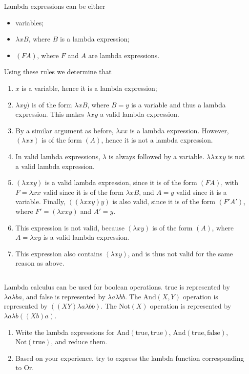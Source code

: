 \begin{solution}
	Lambda expressions can be either
	\begin{itemize}
		\item variables;
		\item \(\lambda x B\), where \(B\) is a lambda expression;
		\item \((F A)\), where \(F\) and \(A\) are lambda expressions.
	\end{itemize}
	Using these rules we determine that
	\begin{enumerate}
		\item \(x\) is a variable, hence it is a lambda expression;
		\item \(\lambda x y)\) is of the form \(\lambda x B\),
		where \(B = y\) is a variable and thus a lambda expression.
		This makes \(\lambda x y\) a valid lambda expression.
		\item By a similar argument as before, \(\lambda x x\)
		is a lambda expression.
		However, \((\lambda x x)\) is of the form \((A)\),
		hence it is not a lambda expression.
		\item In valid lambda expressions,
		\(\lambda\) is always followed by a variable.
		\(\lambda \lambda xxy\) is not a valid lambda expression.
		\item \((\lambda x x y)\) is a valid lambda expression,
		since it is of the form \((F A)\), with
		\(F = \lambda xx\) valid since it is
		of the form \(\lambda x B\),
		and \(A = y\) valid since it is a variable.
		Finally, \(((\lambda xxy)y)\) is also valid,
		since it is of the form \((F' A')\),
		where \(F' = (\lambda x x y)\) and \(A' = y\).
		\item This expression is not valid,
		because \((\lambda x y)\) is of the form \((A)\),
		where \(A = \lambda x y\) is a valid lambda expression.
		\item This expression also contains \((\lambda x y)\),
		and is thus not valid for the same reason as above.
	\end{enumerate}
\end{solution}

\subsection{} %
Lambda calculus can be used for boolean operations.
\(\mathrm{true}\) is represented by \(\lambda a \lambda b a\),
and false is represented by \(\lambda a \lambda b b\).
The \(\mathrm{And}(X, Y)\) operation is represented by
\(((XY)\lambda a \lambda b b)\).
The \(\mathrm{Not}(X)\) operation is represented by
\(\lambda a \lambda b ((X b) a)\).
\begin{enumerate}
	\item Write the lambda expressions
	for \(\mathrm{And}(\mathrm{true}, \mathrm{true})\),
	\(\mathrm{And}(\mathrm{true}, \mathrm{false})\),
	\(\mathrm{Not}(\mathrm{true})\),
	and reduce them.
	\item Based on your experience, try to express the lambda function
	corresponding to \(\mathrm{Or}\).
\end{enumerate}

